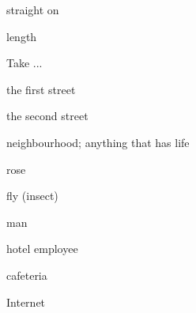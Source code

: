 \begin{flashcard}{\LARGE straight on}
\LARGE {}
\end{flashcard}
\begin{flashcard}{\LARGE length}
\LARGE {}
\end{flashcard}
\begin{flashcard}{\LARGE Take ...}
\LARGE {}
\end{flashcard}
\begin{flashcard}{\LARGE the first street}
\LARGE {}
\end{flashcard}
\begin{flashcard}{\LARGE the second street}
\LARGE {}
\end{flashcard}
\begin{flashcard}{\LARGE neighbourhood; anything that has life}
\LARGE {}
\end{flashcard}
\begin{flashcard}{\LARGE rose}
\LARGE {}
\end{flashcard}
\begin{flashcard}{\LARGE fly (insect)}
\LARGE {}
\end{flashcard}
\begin{flashcard}{\LARGE man}
\LARGE {}
\end{flashcard}
\begin{flashcard}{\LARGE hotel employee}
\LARGE {}
\end{flashcard}
\begin{flashcard}{\LARGE cafeteria}
\LARGE {}
\end{flashcard}
\begin{flashcard}{\LARGE Internet}
\LARGE {}
\end{flashcard}


